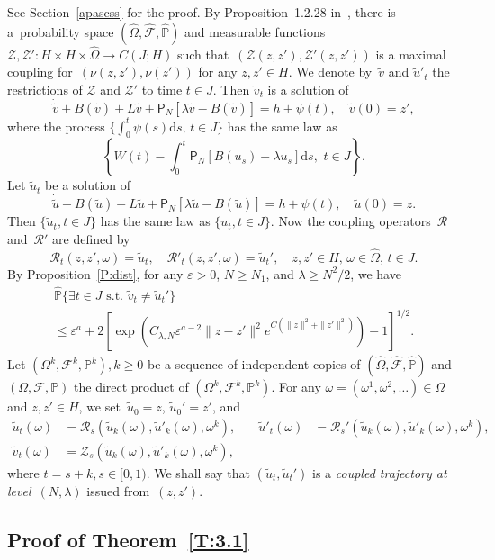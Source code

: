 \documentclass[AHL,Unicode,longabstracts]{cedram}
\newcommand{\e}{\varepsilon}
\newcommand{\pP}{{\mathbb P}}
\newcommand{\FF}{{\mathcal F}}
\newcommand{\RR}{{\mathcal R}}
\newcommand{\la}{\lambda}
\newcommand{\om}{\omega}
\newcommand{\dd}{\mathrm{d}}
\let\oldexists\exists
\renewcommand*{\exists}{\mathrel{\oldexists}}
\begin{document}
See Section~\ref{apascss} for the proof. By Proposition~1.2.28 in~\cite{KS-book}, there is a~probability space $(\hat \Omega, \hat \FF, \hat\pP)$ and measurable functions $\mathcal{Z}, \mathcal{Z}' :H\times H\times \hat \Omega\to C(J;H) $ such that~$(\mathcal{Z} (z,z'), \mathcal{Z}'(z,z'))$ is a maximal coupling for~$(\nu(z,z'), \nu(z'))$ for any $z,z'\in H$. We denote by~$\tilde v$ and $\tilde u'_t$ the restrictions of $\mathcal{Z}$ and $ \mathcal{Z}' $ to time $t\in J$. Then $\tilde v_t$ is a solution of
\[
\dot {\tilde v} + B(\tilde v) + L\tilde v + {\mathsf P}_N[\la \tilde v-B(\tilde v)] = h +\psi(t), \quad \tilde v (0)= z',
\]
where the process $\{\int_0^t\psi(s)\dd s,\, t\in J\}$ has the same law as
\[
\left\{W(t)- \int_0^t {\mathsf P}_N[B(u_s)-\la u_s]\dd s, \,\, t\in J\right\}.
\]
Let $\tilde u_t$ be a solution of
\[
\dot { \tilde u}+B(\tilde u)+L \tilde u + {\mathsf P}_N[\la \tilde u-B(\tilde u)]=h +\psi(t), \quad \tilde u (0)= z.
\]
Then $\{\tilde u_t, t\in J\}$ has the same law as $\{ u_t, t\in J\}$. Now the coupling operators~$\RR$ and~$\RR'$ are defined by
\[
\RR_t(z,z',\omega)=\tilde u_t,\quad \RR'_t(z,z',\omega)=\tilde u_t', \quad z, z'\in H,\, \omega\in\hat\Omega,\, t\in J.
\]
By Proposition~\ref{P:dist}, for any $\e>0$, $N\ge N_1$, and $\la\ge N^2/2 $, we have
\begin{multline}\label{sdsflklk}
\hat \pP\{\exists t\in J\text{ s.t. } \tilde v_t\neq \tilde u_t' \}\\
\le \e^a+ 2 \left[\exp\left(C_{\la,N} \e^{a-2}\|z-z'\|^2 e^{C(\|z\|^2+\|z'\|^2)} \right)-1\right]^{1/2}.
\end{multline}
Let $(\Omega^k,\FF^k,\pP^k), k\ge0$ be a sequence of independent copies of $(\hat \Omega, \hat \FF, \hat\pP)$ and $(\Omega,\FF,\pP)$ the direct product of $(\Omega^k,\FF^k,\pP^k)$. For any $\omega=(\omega^1,\omega^2,\ldots)\in\Omega$ and $z,z'\in H$, we set~$\tilde u_0=z$, $\tilde u_0'=z'$, and
\begin{align*}
\tilde u_t(\omega)&=\RR_s(\tilde u_{k}(\omega),\tilde u'_{k}(\omega),\omega^k), &\quad
\tilde u'_t(\omega)&=\RR_s'(\tilde u_{k}(\omega),\tilde u'_{k}(\omega),\omega^k), \\\tilde v_t(\om)&=\mathcal{Z}_s(\tilde u_{k}(\omega),\tilde u'_{k}(\omega),\omega^k),
\end{align*}
where $t=s+k, s\in [0,1)$. We shall say that $(\tilde u_t,\tilde u_t')$ is a \emph{coupled trajectory at level}~$(N,\la)$ issued from~$(z,z')$.

\subsection{Proof of Theorem~\ref{T:3.1}}
\end{document}
